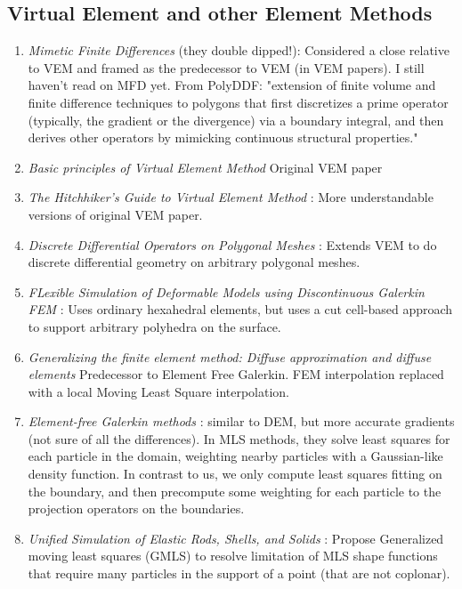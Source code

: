 \subsection{Virtual Element and other Element Methods}
\begin{enumerate}
    \item \textit{Mimetic Finite Differences} \cite{10.1142/S0218202505000832} \cite{10.1016/j.jcp.2013.07.031} (they double dipped!): Considered a close relative to VEM and framed as the predecessor to VEM (in VEM papers). I still haven't read on MFD yet. From PolyDDF: "extension of finite volume and finite difference techniques to polygons that first discretizes a prime operator (typically, the gradient or the divergence) via a boundary integral, and then derives other operators by mimicking continuous structural properties."
    \item \textit{Basic principles of Virtual Element Method} \cite{10.1142/S0218202512500492} Original VEM paper
    \item \textit{The Hitchhiker's Guide to Virtual Element Method} \cite{10.1142/S021820251440003X}: More understandable versions of original VEM paper.
    \item \textit{Discrete Differential Operators on Polygonal Meshes} \cite{10.1145/3386569.3392389}: Extends VEM to do discrete differential geometry on arbitrary polygonal meshes.
    \item \textit{FLexible Simulation of Deformable Models using Discontinuous Galerkin FEM} \cite{10.5555/1632592.1632608}: Uses ordinary hexahedral elements, but uses a cut cell-based approach to support arbitrary polyhedra on the surface. 
    \item \textit{Generalizing the finite element method: Diffuse approximation and diffuse elements} \cite{Nayroles1992GeneralizingTF} Predecessor to Element Free Galerkin. FEM interpolation replaced with a local Moving Least Square interpolation.
    \item \textit{Element-free Galerkin methods} \cite{https://doi.org/10.1002/nme.1620370205}: similar to DEM, but more accurate gradients (not sure of all the differences). In MLS methods, they solve least squares for each particle in the domain, weighting nearby particles with a Gaussian-like density function. In contrast to us, we only compute least squares fitting on the boundary, and then precompute some weighting for each particle to the projection operators on the boundaries.
    \item \textit{Unified Simulation of Elastic Rods, Shells, and Solids} \cite{10.1145/1778765.1778776}: Propose Generalized moving least squares (GMLS) to resolve limitation of MLS shape functions that require many particles in the support of a point (that are not coplonar).  
\end{enumerate}
